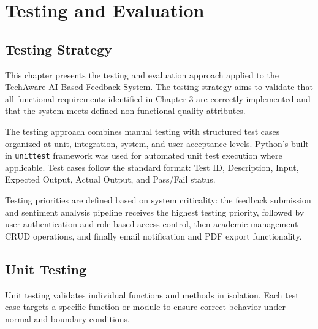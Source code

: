 
\chapter{Testing and Evaluation}

\section{Testing Strategy}

This chapter presents the testing and evaluation approach applied to the TechAware AI-Based Feedback System. The testing strategy aims to validate that all functional requirements identified in Chapter 3 are correctly implemented and that the system meets defined non-functional quality attributes.

The testing approach combines manual testing with structured test cases organized at unit, integration, system, and user acceptance levels. Python's built-in \texttt{unittest} framework was used for automated unit test execution where applicable. Test cases follow the standard format: Test ID, Description, Input, Expected Output, Actual Output, and Pass/Fail status.

Testing priorities are defined based on system criticality: the feedback submission and sentiment analysis pipeline receives the highest testing priority, followed by user authentication and role-based access control, then academic management CRUD operations, and finally email notification and PDF export functionality.


\section{Unit Testing}

Unit testing validates individual functions and methods in isolation. Each test case targets a specific function or module to ensure correct behavior under normal and boundary conditions.

